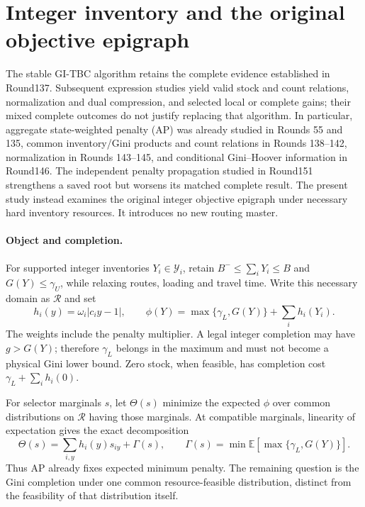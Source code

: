 \section{Integer inventory and the original objective epigraph}
\label{sec:resource-integer-epigraph}

The stable GI-TBC algorithm retains the complete evidence established in
Round137. Subsequent expression studies yield valid stock and count relations,
normalization and dual compression, and selected local or complete gains;
their mixed complete outcomes do not justify replacing that algorithm.
In particular, aggregate state-weighted penalty (AP) was already studied in
Rounds 55 and 135, common inventory/Gini products and count relations in
Rounds 138--142, normalization in Rounds 143--145, and conditional Gini--Hoover
information in Round146. The independent penalty propagation studied in
Round151 strengthens a saved root but worsens its matched complete result.
The present study instead examines the original integer objective epigraph
under necessary hard inventory resources. It introduces no new routing master.

\paragraph{Object and completion.}
For supported integer inventories $Y_i\in\mathcal Y_i$, retain
$B^-\le\sum_iY_i\le B$ and $G(Y)\le\gamma_U$, while relaxing routes,
loading and travel time. Write this necessary domain as $\mathcal R$ and set
\[
 h_i(y)=\omega_i|c_i y-1|,\qquad
 \phi(Y)=\max\{\gamma_L,G(Y)\}+\sum_i h_i(Y_i).
\]
The weights include the penalty multiplier. A legal integer completion may
have $g>G(Y)$; therefore $\gamma_L$ belongs in the maximum and must not become
a physical Gini lower bound. Zero stock, when feasible, has completion cost
$\gamma_L+\sum_i h_i(0)$.

For selector marginals $s$, let $\Theta(s)$ minimize the expected $\phi$ over
common distributions on $\mathcal R$ having those marginals. At compatible
marginals, linearity of expectation gives the exact decomposition
\[
 \Theta(s)=\sum_{i,y}h_i(y)s_{iy}+\Gamma(s),\qquad
 \Gamma(s)=\min\mathbb E[\max\{\gamma_L,G(Y)\}].
\]
Thus AP already fixes expected minimum penalty. The remaining question is
the Gini completion under one common resource-feasible distribution, distinct
from the feasibility of that distribution itself.

